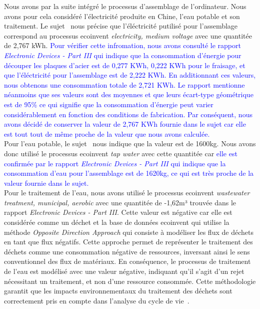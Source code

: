 \documentclass[12pt,a4paper]{paper}
\begin{document}
Nous avons par la suite intégré le processus d'assemblage de l'ordinateur. Nous avons pour cela considéré l'électricité produite en Chine, l'eau potable et son traitement.
Le sujet~\cite{TP2_ACV_ENSEIRB-MATMECA} nous précise que l'éléctricité putilisé pour l'assemblage correspond au processus ecoinvent \textit{electricity,
medium voltage} avec une quantitée de 2,767 kWh. \textcolor{blue}{Pour vérifier cette infromation, nous avons consulté le rapport \textit{Electronic Devices - Part III}\cite{Lehmann2007} qui indique que la consommation d'énergie pour découper les plaques d'acier est de 0,277 KWh, 0,222 KWh pour le fraisage, et que l'éléctricité pour l'assemblage est de 2,222 KWh. En additionnant ces valeurs, nous obtenons une consommation totale de 2,721 KWh. Le rapport mentionne néanmoins que ses valeurs sont des moyennes et que leurs écart-type géométrique est de 95\% ce qui signifie que la consommation d'énergie peut varier considérablement en fonction des conditions de fabrication. Par conséquent, nous avons décidé de conserver la valeur de 2,767 KWh fournie dans le sujet car elle est tout tout de même proche de la valeur que nous avons calculée.}\\
Pour l'eau potable, le sujet~\cite{TP2_ACV_ENSEIRB-MATMECA} nous indique que la valeur est de 1600kg. Nous avons donc utilisé le processus ecoinvent \textit{tap water} avec cette quantitée car \textcolor{blue}{elle est confirmée par le rapport \textit{Electronic Devices - Part III}\cite{Lehmann2007} qui indique que la consommation d'eau pour l'assemblage est de 1620kg, ce qui est très proche de la valeur fournie dans le sujet.}\\
Pour le traitement de l'eau, nous avons utilisé le processus ecoinvent \textit{wastewater treatment, municipal, aerobic} avec une quantitée de -1,62m³ trouvée dans le rapport \textit{Electronic Devices - Part III}\cite{Lehmann2007}. Cette valeur est négative car elle est considérée comme un déchet et la base de données ecoinvent qui utilise la méthode \textit{Opposite Direction Approach} qui consiste à modéliser les flux de déchets en tant que flux négatifs. Cette approche permet de représenter le traitement des déchets comme une consommation négative de ressources, inversant ainsi le sens conventionnel des flux de matériaux. En conséquence, le processus de traitement de l’eau est modélisé avec une valeur négative, indiquant qu’il s’agit d’un rejet nécessitant un traitement, et non d’une ressource consommée. Cette méthodologie garantit que les impacts environnementaux du traitement des déchets sont correctement pris en compte dans l’analyse du cycle de vie~\cite{openLCATutorial2020}.
\end{document}
